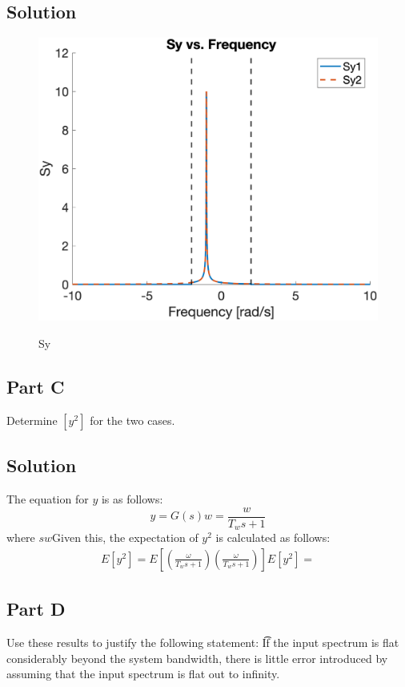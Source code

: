 \documentclass{article}
\begin{document}
\subsection*{Solution}
\begin{figure}[H]
    \centering
    \includegraphics[width=0.75\linewidth]{../figures/p5_sy.png}\label{fig:p5_sy}
    \caption{Sy}
\end{figure}

\subsection*{Part C}
Determine $\left[y^2\right]$ for the two cases.
\subsection*{Solution}
The equation for $y$ is as follows:
\begin{equation}
    y = G(s)w = \frac{w}{T_w s+1}
\end{equation}
where $sw$Given this, the expectation of $y^2$ is calculated as follows:
\begin{gather*}
    E\left[y^2\right] = E\left[(\frac{\omega}{T_w s+1})(\frac{\omega}{T_w s+1})\right]
    E\left[y^2\right] = 
\end{gather*}

\subsection*{Part D}
Use these results to justify the following statement:
\t If the input spectrum is flat considerably beyond the system bandwidth, there is little error introduced by assuming that the input spectrum is flat out to infinity.
\end{document}
